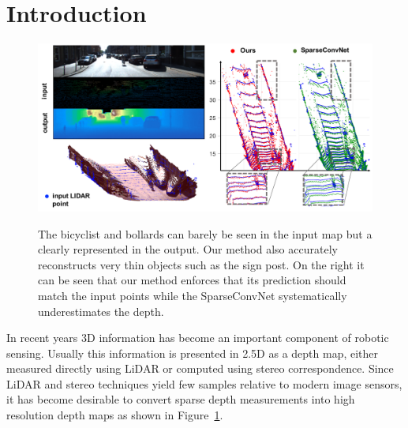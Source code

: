 \section{Introduction}
\begin{figure}
\centering
  \includegraphics[width=\textwidth]{figs/keyfig.pdf}\\
  \caption{The bicyclist and bollards can barely be seen in the input map but a clearly represented in the output. Our method also accurately reconstructs very thin objects such as the sign post. On the right it can be seen that our method enforces that its prediction should match the input points while the SparseConvNet systematically underestimates the depth.}
  \label{fig:intro}
\end{figure}
In recent years 3D information has become an important component of robotic sensing. Usually this information is presented in 2.5D as a depth map, either measured directly using LiDAR or computed using stereo correspondence. Since LiDAR and stereo techniques yield few samples relative to modern image sensors, it has become desirable to convert sparse depth measurements into high resolution depth maps as shown in Figure~\ref{fig:intro}.


